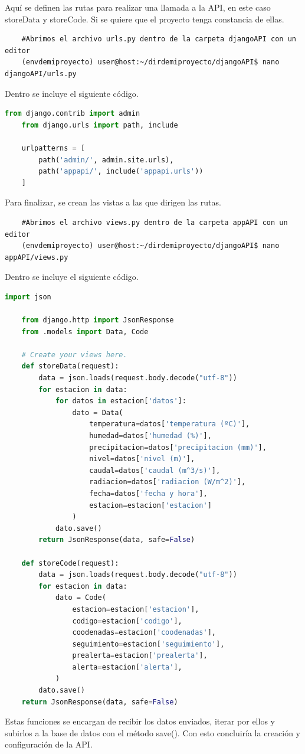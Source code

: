 Aquí se definen las rutas para realizar una llamada a la API, en este caso storeData y storeCode.\newline
\newline
Si se quiere que el proyecto tenga constancia de ellas.

\begin{verbatim}
	#Abrimos el archivo urls.py dentro de la carpeta djangoAPI con un editor
	(envdemiproyecto) user@host:~/dirdemiproyecto/djangoAPI$ nano djangoAPI/urls.py
\end{verbatim}

Dentro se incluye el siguiente código.

\begin{lstlisting}[language=Python, caption={Modelos Django}]
	from django.contrib import admin
	from django.urls import path, include
	
	urlpatterns = [
		path('admin/', admin.site.urls),
		path('appapi/', include('appapi.urls'))
	]
\end{lstlisting}

Para finalizar, se crean las vistas a las que dirigen las rutas.

\begin{verbatim}
	#Abrimos el archivo views.py dentro de la carpeta appAPI con un editor
	(envdemiproyecto) user@host:~/dirdemiproyecto/djangoAPI$ nano appAPI/views.py
\end{verbatim}

Dentro se incluye el siguiente código.

\begin{lstlisting}[language=Python, caption={Modelos Django}]
	import json
	
	from django.http import JsonResponse
	from .models import Data, Code
	
	# Create your views here.
	def storeData(request):
		data = json.loads(request.body.decode("utf-8"))
		for estacion in data:
			for datos in estacion['datos']:
				dato = Data(
					temperatura=datos['temperatura (ºC)'],
					humedad=datos['humedad (%)'],
					precipitacion=datos['precipitacion (mm)'],
					nivel=datos['nivel (m)'],
					caudal=datos['caudal (m^3/s)'],
					radiacion=datos['radiacion (W/m^2)'],
					fecha=datos['fecha y hora'],
					estacion=estacion['estacion']
				)
			dato.save()
		return JsonResponse(data, safe=False)
	
	def storeCode(request):
		data = json.loads(request.body.decode("utf-8"))
		for estacion in data:
			dato = Code(
				estacion=estacion['estacion'],
				codigo=estacion['codigo'],
				coodenadas=estacion['coodenadas'],
				seguimiento=estacion['seguimiento'],
				prealerta=estacion['prealerta'],
				alerta=estacion['alerta'],
			)
		dato.save()
	return JsonResponse(data, safe=False)
\end{lstlisting}

Estas funciones se encargan de recibir los datos enviados, iterar por ellos y subirlos a la base de datos con el método save().\newline
\newline
Con esto concluiría la creación y configuración de la API.

